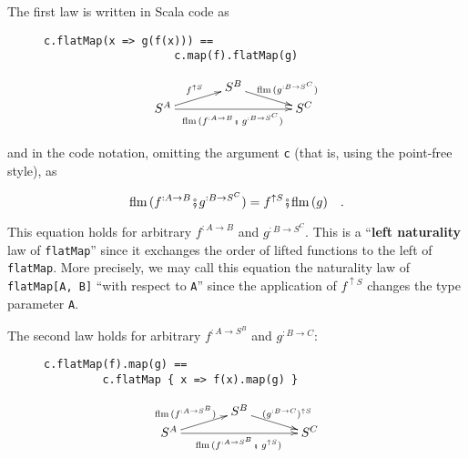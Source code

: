 The first law is written in Scala code as

\begin{wrapfigure}{l}{0.4\columnwidth}%
\vspace{-0.75\baselineskip}

\begin{lstlisting}
c.flatMap(x => g(f(x))) ==
                    c.map(f).flatMap(g)
\end{lstlisting}
\vspace{0.2\baselineskip}
\[
\xymatrix{\xyScaleY{0.2pc}\xyScaleX{3pc} & S^{B}\ar[rd]\sp(0.5){~~\ \text{flm}\,(g^{:B\rightarrow S^{C}})}\\
S^{A}\ar[ru]\sp(0.5){f^{\uparrow S}}\ar[rr]\sb(0.5){\text{flm}\,(f^{:A\rightarrow B}\bef\,g^{:B\rightarrow S^{C}})\,} &  & S^{C}
}
\]

\vspace{-0.6\baselineskip}
\end{wrapfigure}%

\noindent and in the code notation, omitting the argument \lstinline!c!
(that is, using the point-free style), as

\begin{equation}
\text{flm}\,(f^{:A\rightarrow B}\bef g^{:B\rightarrow S^{C}})=f^{\uparrow S}\bef\text{flm}\,(g)\quad.\label{eq:left-naturality-law-flatMap}
\end{equation}

\noindent This equation holds for arbitrary $f^{:A\rightarrow B}$
and $g^{:B\rightarrow S^{C}}$. This is a \textsf{``}\textbf{left naturality}
law of \lstinline!flatMap!\textsf{''}
since it exchanges the order of lifted functions to the left of \lstinline!flatMap!.
More precisely, we may call this equation the naturality law of \lstinline!flatMap[A, B]!
\textsf{``}with respect to \lstinline!A!\textsf{''} since the application of $f^{\uparrow S}$
changes the type parameter \lstinline!A!.

The second law holds for arbitrary $f^{:A\rightarrow S^{B}}$ and
$g^{:B\rightarrow C}$:

\begin{wrapfigure}{l}{0.4\columnwidth}%
\vspace{-0.75\baselineskip}

\begin{lstlisting}
c.flatMap(f).map(g) ==
         c.flatMap { x => f(x).map(g) }
\end{lstlisting}
\vspace{0.2\baselineskip}
\[
\xymatrix{\xyScaleY{0.2pc}\xyScaleX{3pc} & S^{B}\ar[rd]\sp(0.5){\ \,(g^{:B\rightarrow C})^{\uparrow S}}\\
S^{A}\ar[ru]\sp(0.5){\text{flm}\,(f^{:A\rightarrow S^{B}})~~~}\ar[rr]\sb(0.5){\text{flm}\,(f^{:A\rightarrow S^{B}}\bef\,g^{\uparrow S})\,} &  & S^{C}
}
\]

\vspace{-0.2\baselineskip}
\end{wrapfigure}%

